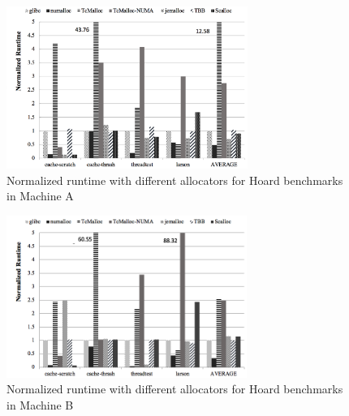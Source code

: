 \begin{figure}[H]
    \centering
    \includegraphics[width=\textwidth,height=200]{figure/2-node-hoard-perf.png}
    \caption{Normalized runtime with different allocators for Hoard benchmarks in Machine A}
    \label{2node-hoard-perf}
\end{figure}

\begin{figure}[H]
    \centering
    \includegraphics[width=\textwidth,height=200]{figure/8-node-hoard-perf.png}
    \caption{Normalized runtime with different allocators for Hoard benchmarks in Machine B}
    \label{8node-hoard-perf}
\end{figure}

